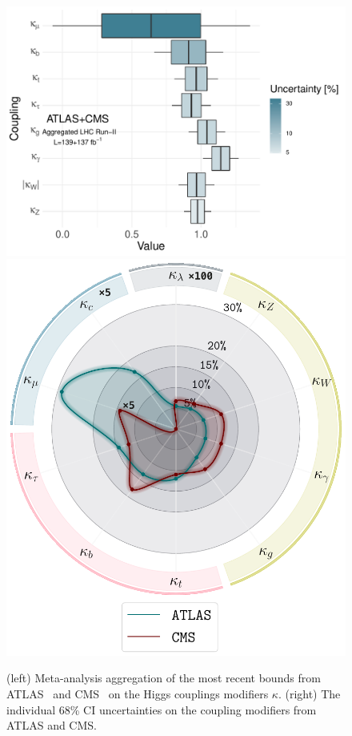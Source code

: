 \begin{figure}[htb!]
	\begin{center}
		\includegraphics[height=0.3\textheight]{figures/agg_higgs_couplings}
		\includegraphics[height=0.3\textheight]{figures/Higgs_couplings_poster}
		\caption{(left) Meta-analysis aggregation of the most recent bounds from ATLAS~\cite{ATLAS2021vrm} and CMS~\cite{CMS:2020gsy} on the Higgs couplings modifiers $\kappa$. (right) The individual 68\% CI uncertainties on the coupling modifiers from ATLAS and CMS.   }	
		\label{fig:couplings-bound}
	\end{center}
\end{figure}
